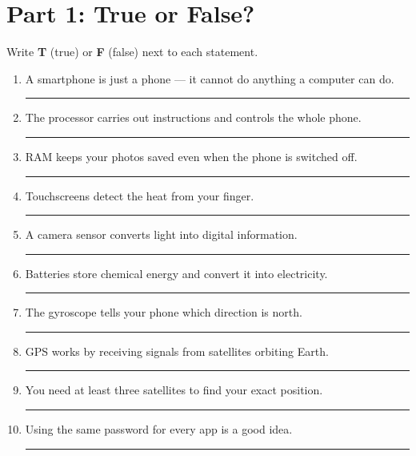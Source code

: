 


\section*{Part 1: True or False?}

\begin{tcolorbox}[enhanced,colback=SkyBlue!10,colframe=TechPurple,arc=6pt,boxrule=1pt,
  left=10pt,right=10pt,top=8pt,bottom=8pt]

Write \textbf{T} (true) or \textbf{F} (false) next to each statement.

\begin{enumerate}[label=\textbf{\arabic*.}]
  \item A smartphone is just a phone — it cannot do anything a computer can do. \hfill \rule{1.5cm}{0.4pt}
  \item The processor carries out instructions and controls the whole phone. \hfill \rule{1.5cm}{0.4pt}
  \item RAM keeps your photos saved even when the phone is switched off. \hfill \rule{1.5cm}{0.4pt}
  \item Touchscreens detect the heat from your finger. \hfill \rule{1.5cm}{0.4pt}
  \item A camera sensor converts light into digital information. \hfill \rule{1.5cm}{0.4pt}
  \item Batteries store chemical energy and convert it into electricity. \hfill \rule{1.5cm}{0.4pt}
  \item The gyroscope tells your phone which direction is north. \hfill \rule{1.5cm}{0.4pt}
  \item GPS works by receiving signals from satellites orbiting Earth. \hfill \rule{1.5cm}{0.4pt}
  \item You need at least three satellites to find your exact position. \hfill \rule{1.5cm}{0.4pt}
  \item Using the same password for every app is a good idea. \hfill \rule{1.5cm}{0.4pt}
\end{enumerate}
\end{tcolorbox}

